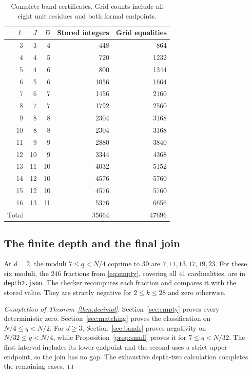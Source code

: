 \documentclass[11pt,a4paper]{article}
\theoremstyle{remark}
\numberwithin{equation}{section}
\begin{document}
\begin{table}[htbp]
\centering
\begin{tabular}{@{}rrrrr@{}}
\toprule
\(\ell\)&\(J\)&\(D\)&Stored integers&Grid equalities\\
\midrule
3&3&4&448&864\\
4&4&5&720&1232\\
5&4&6&800&1344\\
6&5&6&1056&1664\\
7&6&7&1456&2160\\
8&7&7&1792&2560\\
9&8&8&2304&3168\\
10&8&8&2304&3168\\
11&9&9&2880&3840\\
12&10&9&3344&4368\\
13&11&10&4032&5152\\
14&12&10&4576&5760\\
15&12&10&4576&5760\\
16&13&11&5376&6656\\
\midrule
Total&&&35664&47696\\
\bottomrule
\end{tabular}
\caption{Complete band certificates. Grid counts include all eight
unit residues and both formal endpoints.}\label{tab:bands}
\end{table}


\subsection{The finite depth and the final join}
At \(d=2\), the moduli \(7\le q<N/4\) coprime to \(30\) are
\(7,11,13,17,19,23\).
For these six moduli, the \(246\) fractions from \eqref{eq:empty},
covering all \(41\) cardinalities, are in \texttt{depth2.json}.
The checker recomputes each fraction and compares it with the stored
value. They are strictly negative for \(2\le k\le28\) and zero otherwise.

\begin{proof}[Completion of Theorem~\ref{thm:decimal}]
Section~\ref{sec:empty} proves every deterministic zero.
Section~\ref{sec:matching} proves the classification on
\(N/4\le q<N/2\).
For \(d\ge3\), Section~\ref{sec:bands} proves negativity on
\(N/32\le q<N/4\), while Proposition~\ref{prop:small} proves it for
\(7\le q<N/32\).
The first interval includes its lower endpoint and the second
uses a strict upper endpoint, so the join has no gap.
The exhaustive depth-two calculation completes the remaining cases.
\end{proof}
\end{document}
